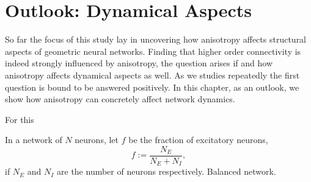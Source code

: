 \chapter{Outlook: Dynamical Aspects}\label{ch:dynamical_aspects}

So far the focus of this study lay in uncovering how anisotropy
affects structural aspects of geometric neural networks. Finding that
higher order connectivity is indeed strongly influenced by anisotropy,
the question arises if and how anisotropy affects dynamical aspects as
well. As we studies repeatedly the first question is bound to be
answered positively. In this chapter, as an outlook, we show how
anisotropy can concretely affect network dynamics.

For this

In a network of $N$ neurons, let $f$ be the fraction of excitatory
neurons,
\[f:= \frac{N_E}{N_E + N_I},
\] if $N_E$ and $N_I$ are the number of neurons respectively.
Balanced network. 


